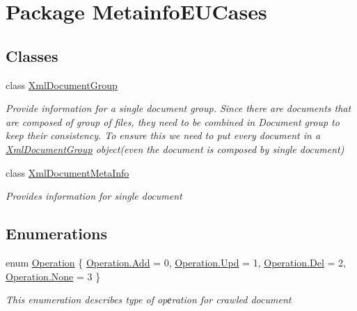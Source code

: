 \hypertarget{namespace_metainfo_e_u_cases}{\section{Package Metainfo\-E\-U\-Cases}
\label{namespace_metainfo_e_u_cases}
}
\subsection*{Classes}
\begin{DoxyCompactItemize}
\item 
class \hyperlink{class_metainfo_e_u_cases_1_1_xml_document_group}{Xml\-Document\-Group}
\begin{DoxyCompactList}\small\item\em Provide information for a single document group. Since there are documents that are composed of group of files, they need to be combined in Document group to keep their consistency. To ensure this we need to put every document in a \hyperlink{class_metainfo_e_u_cases_1_1_xml_document_group}{Xml\-Document\-Group} object(even the document is composed by single document) \end{DoxyCompactList}\item 
class \hyperlink{class_metainfo_e_u_cases_1_1_xml_document_meta_info}{Xml\-Document\-Meta\-Info}
\begin{DoxyCompactList}\small\item\em Provides information for single document \end{DoxyCompactList}\end{DoxyCompactItemize}
\subsection*{Enumerations}
\begin{DoxyCompactItemize}
\item 
enum \hyperlink{namespace_metainfo_e_u_cases_a31e7a82bcb29caae96833aaadc2809c5}{Operation} \{ \hyperlink{namespace_metainfo_e_u_cases_a31e7a82bcb29caae96833aaadc2809c5aec211f7c20af43e742bf2570c3cb84f9}{Operation.\-Add} = 0, 
\hyperlink{namespace_metainfo_e_u_cases_a31e7a82bcb29caae96833aaadc2809c5a0b3c800bc44abd565e156b605571cdc0}{Operation.\-Upd} = 1, 
\hyperlink{namespace_metainfo_e_u_cases_a31e7a82bcb29caae96833aaadc2809c5a5526d60feb55086fbd12dd96b071a093}{Operation.\-Del} = 2, 
\hyperlink{namespace_metainfo_e_u_cases_a31e7a82bcb29caae96833aaadc2809c5a6adf97f83acf6453d4a6a4b1070f3754}{Operation.\-None} = 3
 \}
\begin{DoxyCompactList}\small\item\em This enumeration describes type of opеration for crawled document \end{DoxyCompactList}\end{DoxyCompactItemize}


